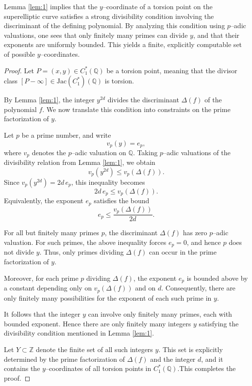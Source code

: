 \documentclass[12pt, reqno]{amsart}
\numberwithin{equation}{section}
\theoremstyle{definition}
\theoremstyle{nodefstyle}
\begin{document}
Lemma \autoref{lem:1} implies that the $y$--coordinate of a torsion point on the superelliptic curve satisfies a strong divisibility condition involving the discriminant of the defining polynomial. By analyzing this condition using $p$--adic valuations, one sees that only finitely many primes can divide $y$, and that their exponents are uniformly bounded. This yields a finite, explicitly computable set of possible $y$--coordinates.
\begin{proof}
Let $P=(x,y)\in C_1^*(\mathbb{Q})$ be a torsion point, meaning that the divisor class $[P-\infty]\in \mathrm{Jac}(C_1^*)(\mathbb{Q})$ is torsion.

By Lemma \autoref{lem:1}, the integer $y^{2d}$ divides the discriminant $\Delta(f)$ of the polynomial $f$. We now translate this condition into constraints on the prime factorization of $y$.

Let $p$ be a prime number, and write
\[
v_p(y)=e_p,
\]
where $v_p$ denotes the $p$--adic valuation on $\mathbb{Q}$. Taking $p$--adic valuations of the divisibility relation from Lemma \autoref{lem:1}, we obtain
\[
v_p(y^{2d}) \le v_p(\Delta(f)).
\]
Since $v_p(y^{2d})=2d\,e_p$, this inequality becomes
\[
2d\,e_p \le v_p(\Delta(f)).
\]
Equivalently, the exponent $e_p$ satisfies the bound
\[
e_p \le \frac{v_p(\Delta(f))}{2d}.
\]

For all but finitely many primes $p$, the discriminant $\Delta(f)$ has zero $p$--adic valuation. For such primes, the above inequality forces $e_p=0$, and hence $p$ does not divide $y$. Thus, only primes dividing $\Delta(f)$ can occur in the prime factorization of $y$.

Moreover, for each prime $p$ dividing $\Delta(f)$, the exponent $e_p$ is bounded above by a constant depending only on $v_p(\Delta(f))$ and on $d$. Consequently, there are only finitely many possibilities for the exponent of each such prime in $y$.

It follows that the integer $y$ can involve only finitely many primes, each with bounded exponent. Hence there are only finitely many integers $y$ satisfying the divisibility condition mentioned in Lemma \autoref{lem:1}.

Let $Y\subset\mathbb{Z}$ denote the finite set of all such integers $y$. This set is explicitly determined by the prime factorization of $\Delta(f)$ and the integer $d$, and it contains the $y$--coordinates of all torsion points in $C_1^*(\mathbb{Q})$.This completes the proof.
\end{proof}
\end{document}
